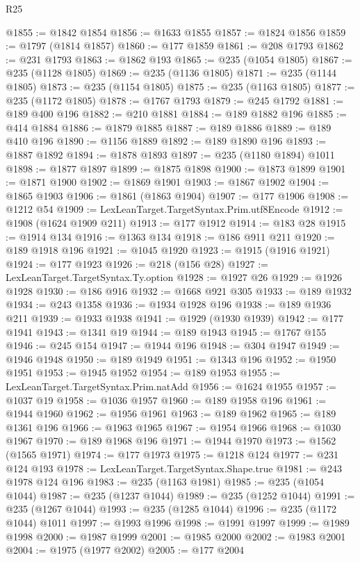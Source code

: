 \begin{lexlean}{R25}
\begin{coremodule}
@1855 := @1842 @1854
@1856 := @1633 @1855
@1857 := @1824 @1856
@1859 := @1797 (@1814 @1857)
@1860 := @177 @1859
@1861 := @208 @1793
@1862 := @231 @1793
@1863 := @1862 @193
@1865 := @235 (@1054 @1805)
@1867 := @235 (@1128 @1805)
@1869 := @235 (@1136 @1805)
@1871 := @235 (@1144 @1805)
@1873 := @235 (@1154 @1805)
@1875 := @235 (@1163 @1805)
@1877 := @235 (@1172 @1805)
@1878 := @1767 @1793
@1879 := @245 @1792
@1881 := @189 @400 @196
@1882 := @210 @1881
@1884 := @189 @1882 @196
@1885 := @414 @1884
@1886 := @1879 @1885
@1887 := @189 @1886
@1889 := @189 @410 @196
@1890 := @1156 @1889
@1892 := @189 @1890 @196
@1893 := @1887 @1892
@1894 := @1878 @1893
@1897 := @235 (@1180 @1894) @1011
@1898 := @1877 @1897
@1899 := @1875 @1898
@1900 := @1873 @1899
@1901 := @1871 @1900
@1902 := @1869 @1901
@1903 := @1867 @1902
@1904 := @1865 @1903
@1906 := @1861 (@1863 @1904)
@1907 := @177 @1906
@1908 := @1212 @54
@1909 := LexLeanTarget.TargetSyntax.Prim.utf8Encode
@1912 := @1908 (@1624 @1909 @211)
@1913 := @177 @1912
@1914 := @183 @28
@1915 := @1914 @134
@1916 := @1363 @134
@1918 := @186 @911 @211
@1920 := @189 @1918 @196
@1921 := @1045 @1920
@1923 := @1915 (@1916 @1921)
@1924 := @177 @1923
@1926 := @218 (@156 @28)
@1927 := LexLeanTarget.TargetSyntax.Ty.option
@1928 := @1927 @26
@1929 := @1926 @1928
@1930 := @186 @916
@1932 := @1668 @921 @305
@1933 := @189 @1932
@1934 := @243 @1358
@1936 := @1934 @1928 @196
@1938 := @189 @1936 @211
@1939 := @1933 @1938
@1941 := @1929 (@1930 @1939)
@1942 := @177 @1941
@1943 := @1341 @19
@1944 := @189 @1943
@1945 := @1767 @155
@1946 := @245 @154
@1947 := @1944 @196
@1948 := @304 @1947
@1949 := @1946 @1948
@1950 := @189 @1949
@1951 := @1343 @196
@1952 := @1950 @1951
@1953 := @1945 @1952
@1954 := @189 @1953
@1955 := LexLeanTarget.TargetSyntax.Prim.natAdd
@1956 := @1624 @1955
@1957 := @1037 @19
@1958 := @1036 @1957
@1960 := @189 @1958 @196
@1961 := @1944 @1960
@1962 := @1956 @1961
@1963 := @189 @1962
@1965 := @189 @1361 @196
@1966 := @1963 @1965
@1967 := @1954 @1966
@1968 := @1030 @1967
@1970 := @189 @1968 @196
@1971 := @1944 @1970
@1973 := @1562 (@1565 @1971)
@1974 := @177 @1973
@1975 := @1218 @124
@1977 := @231 @124 @193
@1978 := LexLeanTarget.TargetSyntax.Shape.true
@1981 := @243 @1978 @124 @196
@1983 := @235 (@1163 @1981)
@1985 := @235 (@1054 @1044)
@1987 := @235 (@1237 @1044)
@1989 := @235 (@1252 @1044)
@1991 := @235 (@1267 @1044)
@1993 := @235 (@1285 @1044)
@1996 := @235 (@1172 @1044) @1011
@1997 := @1993 @1996
@1998 := @1991 @1997
@1999 := @1989 @1998
@2000 := @1987 @1999
@2001 := @1985 @2000
@2002 := @1983 @2001
@2004 := @1975 (@1977 @2002)
@2005 := @177 @2004

\end{coremodule}
\end{lexlean}
